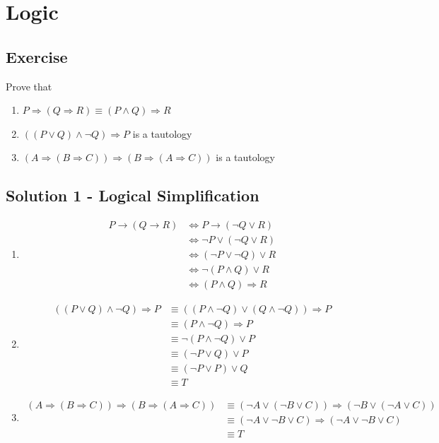 \documentclass[12pt]{article}
\begin{document}
\section{Logic}
\subsection{Exercise}
\par Prove that 
\begin{enumerate}
	\item $P \Rightarrow (Q \Rightarrow R) \equiv (P \wedge Q) \Rightarrow R$
	\item $((P \vee Q) \wedge \neg Q) \Rightarrow P$ is a tautology
	\item $(A \Rightarrow (B \Rightarrow C)) \Rightarrow (B \Rightarrow (A \Rightarrow C))$ is a tautology
\end{enumerate}
\subsection{Solution 1 - Logical Simplification}
\begin{enumerate}
	\item 
	\begin{equation*}
	\begin{aligned}
	P \rightarrow (Q \rightarrow R) &\Leftrightarrow P \rightarrow (\neg Q \vee R) \\
	&\Leftrightarrow \neg P \vee (\neg Q \vee R) \\
	&\Leftrightarrow (\neg P \vee \neg Q) \vee R\\
	&\Leftrightarrow \neg (P \wedge Q) \vee R\\
	&\Leftrightarrow (P \wedge Q) \Rightarrow R
	\end{aligned}
	\end{equation*}
	\item 
	\begin{equation*}
	\begin{aligned}
	((P \vee Q) \wedge \neg Q) \Rightarrow P &\equiv ((P \wedge \neg Q) \vee (Q \wedge \neg Q)) \Rightarrow P\\
	&\equiv (P \wedge \neg Q) \Rightarrow P\\
	&\equiv \neg (P \wedge \neg Q) \vee P\\
	&\equiv (\neg P \vee Q) \vee P\\
	&\equiv (\neg P \vee P) \vee Q\\
	&\equiv T
	\end{aligned}
	\end{equation*}
	\item 
	\begin{equation*}
	\begin{aligned}
	(A \Rightarrow (B \Rightarrow C)) \Rightarrow (B \Rightarrow (A \Rightarrow C)) & \equiv (\neg A \vee (\neg B \vee C)) \Rightarrow (\neg B \vee (\neg A \vee C)) \\
	&\equiv (\neg A \vee \neg B \vee C) \Rightarrow (\neg A \vee \neg B \vee C)\\
	&\equiv T
	\end{aligned}
	\end{equation*}
\end{enumerate}
\end{document}
